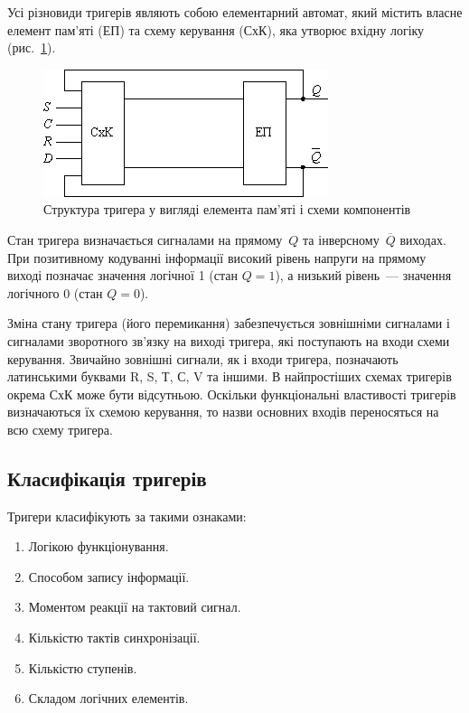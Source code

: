 \documentclass[a4paper,oneside,DIV=10,12pt]{scrartcl}
\newcommand\barneg[1]{\overline{#1}}
\begin{document}
			Усі різновиди тригерів являють собою елементарний автомат, який містить власне елемент пам'яті (ЕП) та схему керування (СхК), яка утворює вхідну логіку (рис.~\ref{fig:flipflop-structure-scheme}).
			
			\begin{figure}[!htbp]
			\centering
				\includegraphics[]{flipflop-structure-scheme.png}
			\caption{Структура тригера у вигляді елемента пам'яті і схеми компонентів}
			\label{fig:flipflop-structure-scheme}
			\end{figure}
			
			Стан тригера визначається сигналами на прямому~$Q$ та інверсному~$\barneg{Q}$ виходах. При позитивному кодуванні інформації високий рівень напруги на прямому виході позначає значення логічної 1 (стан $Q = 1$), а низький рівень~— значення логічного 0 (стан $Q = 0$).
			
			Зміна стану тригера (його перемикання) забезпечується зовнішніми сигналами і сигналами зворотного зв’язку на виході тригера, які поступають на входи схеми керування. Звичайно зовнішні сигнали, як і входи тригера, позначають латинськими буквами R, S, Т, С, V та іншими. В найпростіших схемах тригерів окрема СхК може бути відсутньою. Оскільки функціональні властивості тригерів визначаються їх схемою керування, то назви основних входів переносяться на всю схему тригера.
			
		\subsection{Класифікація тригерів}
			Тригери класифікують за такими ознаками:
			\begin{enumerate}
				\item Логікою функціонування.
				\item Способом запису інформації.
				\item Моментом реакції на тактовий сигнал.
				\item Кількістю тактів синхронізації.
				\item Кількістю ступенів.
				\item Складом логічних елементів.
			\end{enumerate}
			
\end{document}
